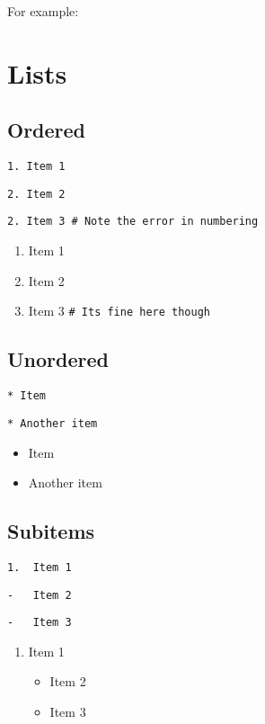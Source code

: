 \documentclass[
  letterpaper,
  DIV=11,
  numbers=noendperiod]{scrartcl}
\providecommand{\tightlist}{%
  \setlength{\itemsep}{0pt}\setlength{\parskip}{0pt}}\usepackage{longtable,booktabs,array}
\begin{document}
For example:

\hypertarget{lists}{%
\section{Lists}\label{lists}}

\subsection{Ordered}

\texttt{1.\ Item\ 1}

\texttt{2.\ Item\ 2}

\texttt{2.\ Item\ 3\ \#\ Note\ the\ error\ in\ numbering}

\begin{enumerate}
\def\labelenumi{\arabic{enumi}.}
\item
  Item 1
\item
  Item 2
\item
  Item 3 \texttt{\#\ It\textquotesingle{}s\ fine\ here\ though}
\end{enumerate}

\subsection{Unordered}

\texttt{*\ Item}

\texttt{*\ Another\ item}

\begin{itemize}
\item
  Item
\item
  Another item
\end{itemize}

\subsection{Subitems}

\texttt{1.\ \ Item\ 1}

\texttt{-\ \ \ Item\ 2}

\texttt{-\ \ \ Item\ 3}

\begin{enumerate}
\def\labelenumi{\arabic{enumi}.}
\tightlist
\item
  Item 1

  \begin{itemize}
  \tightlist
  \item
    Item 2
  \item
    Item 3
  \end{itemize}
\end{enumerate}
\end{document}
